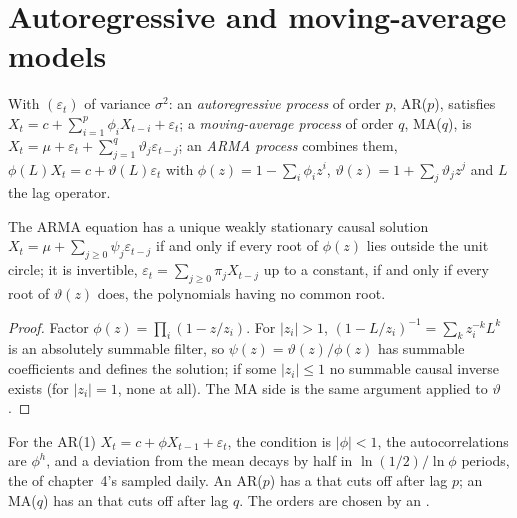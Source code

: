 \section{Autoregressive and moving-average models}

\begin{definition}\label{def:qm:linear-time-series:arma}
With $(\varepsilon_t)$  of variance $\sigma^2$: an \emph{autoregressive process} of order $p$, AR($p$), satisfies
$X_t = c + \sum_{i=1}^p\phi_iX_{t-i} + \varepsilon_t$; a \emph{moving-average process} of order $q$, MA($q$), is $X_t = \mu +
\varepsilon_t + \sum_{j=1}^q\vartheta_j\varepsilon_{t-j}$; an \emph{ARMA process} combines them, $\phi(L)X_t = c + \vartheta(L)\varepsilon_t$ with
$\phi(z) = 1 - \sum_i\phi_iz^i$, $\vartheta(z) = 1 + \sum_j\vartheta_jz^j$ and $L$ the lag operator.
\end{definition}

\begin{proposition}\label{prop:qm:linear-time-series:roots}
The ARMA equation has a unique weakly stationary causal solution $X_t = \mu + \sum_{j \ge 0}\psi_j\varepsilon_{t-j}$ if and only if every root of $\phi(z)$
lies outside the unit circle; it is invertible, $\varepsilon_t = \sum_{j \ge 0}\pi_jX_{t-j}$ up to a constant, if and only if every root of $\vartheta(z)$
does, the polynomials having no common root.
\end{proposition}

\begin{proof}
Factor $\phi(z) = \prod_i(1 - z/z_i)$. For $|z_i| > 1$, $(1 - L/z_i)^{-1} = \sum_kz_i^{-k}L^k$ is an absolutely summable filter, so $\psi(z) = \vartheta(z)/\phi(z)$
has summable coefficients and defines the solution; if some $|z_i| \le 1$ no summable causal inverse exists (for $|z_i| = 1$, none at all). The MA side
is the same argument applied to $\vartheta$.
\end{proof}

For the AR(1) $X_t = c + \phi X_{t-1} + \varepsilon_t$, the condition is $|\phi| < 1$, the autocorrelations are $\phi^h$, and a deviation from the mean
decays by half in $\ln(1/2)/\ln\phi$ periods, the  of chapter~4's  sampled daily. An AR($p$) has a  that cuts off after lag $p$; an MA($q$) has an  that cuts off after lag $q$. The orders are
chosen by an .

